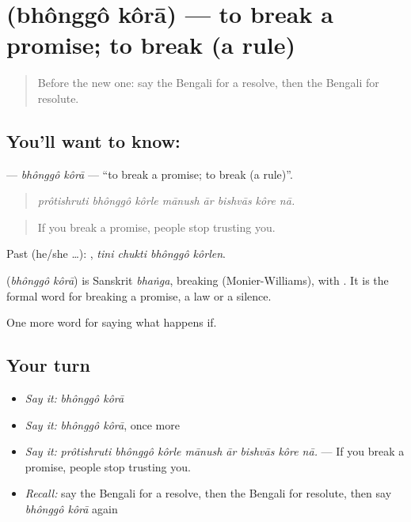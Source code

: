 \section[\texorpdfstring{\bn{ভঙ্গ} \bn{করা} (bhônggô kôrā)}{ভঙ্গ করা (bhônggô kôrā)}]{  (bhônggô kôrā) — to break a promise; to break (a rule)}

\label{lesson:BN-C379-bhonggo-kora}



\begin{quote}
Before the new one: say the Bengali for a resolve, then the Bengali for resolute.
\end{quote}

\subsection*{You'll want to know:  }
\textbf{ } — \emph{bhônggô kôrā} — \textquotedblleft{}to break a promise; to break (a rule)\textquotedblright{}.

\begin{quote}
       
\end{quote}

\begin{quote}
\emph{prôtishruti bhônggô kôrle mānush ār bishvās kôre nā.}
\end{quote}

\begin{quote}
If you break a promise, people stop trusting you.
\end{quote}

Past (he/she …):    , \emph{tini chukti bhônggô kôrlen}.

\begin{cousinweb}
\textbf{ } (\emph{bhônggô kôrā}) is Sanskrit \emph{bhaṅga}, breaking (Monier-Williams), with . It is the formal word for breaking a promise, a law or a silence.
\end{cousinweb}

\begin{grammarlens}[title={What you've built}]
One more word for saying what happens if.
\end{grammarlens}

\subsection*{Your turn}
\begin{itemize}
\raggedright
  \item \emph{Say it:} \emph{bhônggô kôrā}
  \item \emph{Say it:} \emph{bhônggô kôrā}, once more
  \item \emph{Say it:} \emph{prôtishruti bhônggô kôrle mānush ār bishvās kôre nā.} — If you break a promise, people stop trusting you.
  \item \emph{Recall:} say the Bengali for a resolve, then the Bengali for resolute, then say \emph{bhônggô kôrā} again
\end{itemize}

